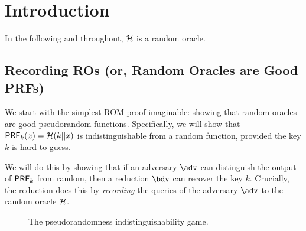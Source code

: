 \section{Introduction}
  
  In the following and throughout, $\mathcal{H}$ is a random oracle.

  \subsection{Recording ROs (or, Random Oracles are Good PRFs)}
    We start with the simplest ROM proof imaginable: showing that random
      oracles are good pseudorandom functions. Specifically, we will show that
      ${\mathsf{PRF}}_k(x) = \mathcal{H}(k || x)$ is indistinguishable from a random function, provided the
      key $k$ is hard to guess.
      
    We will do this by showing that if an adversary $\adv$ can
      distinguish the output of ${\mathsf{PRF}}_k$ from random, then a reduction $\bdv$
      can recover the key $k$. Crucially, the reduction does this by
      \emph{recording} the queries of the adversary $\adv$ to the random oracle
      $\mathcal{H}$.


    \begin{figure}[t]
      \centering
      \begin{pchstack}

        \pchspace

      \end{pchstack}
      \caption{
        The pseudorandomness indistinguishability game.
      }
    \label{fig:prf-ind}
    \end{figure}

